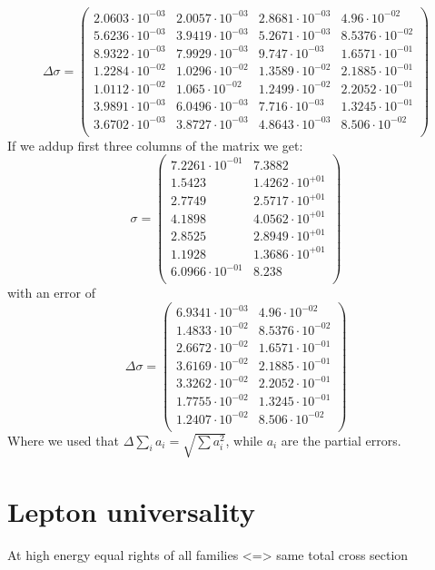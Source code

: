 \documentclass[]{article}
\begin{document}
\begin{equation}
\Delta\sigma=\begin{pmatrix}
   2.0603\cdot 10^{-03} & 2.0057\cdot 10^{-03} & 2.8681\cdot 10^{-03} & 4.96\cdot 10^{-02} \\
   5.6236\cdot 10^{-03} & 3.9419\cdot 10^{-03} & 5.2671\cdot 10^{-03} & 8.5376\cdot 10^{-02} \\
   8.9322\cdot 10^{-03} & 7.9929\cdot 10^{-03} & 9.747\cdot 10^{-03} & 1.6571\cdot 10^{-01} \\
   1.2284\cdot 10^{-02} & 1.0296\cdot 10^{-02} & 1.3589\cdot 10^{-02} & 2.1885\cdot 10^{-01} \\
   1.0112\cdot 10^{-02} & 1.065\cdot 10^{-02} & 1.2499\cdot 10^{-02} & 2.2052\cdot 10^{-01} \\
   3.9891\cdot 10^{-03} & 6.0496\cdot 10^{-03} & 7.716\cdot 10^{-03} & 1.3245\cdot 10^{-01} \\
   3.6702\cdot 10^{-03} & 3.8727\cdot 10^{-03} & 4.8643\cdot 10^{-03} & 8.506\cdot 10^{-02} \\
\end{pmatrix}
\end{equation}
If we addup first three columns of the matrix we get:
\begin{equation}
\sigma=
\begin{pmatrix}
   7.2261\cdot 10^{-01} & 7.3882 \\
   1.5423 & 1.4262\cdot 10^{+01} \\
   2.7749 & 2.5717\cdot 10^{+01} \\
   4.1898 & 4.0562\cdot 10^{+01} \\
   2.8525 & 2.8949\cdot 10^{+01} \\
   1.1928 & 1.3686\cdot 10^{+01} \\
   6.0966\cdot 10^{-01} & 8.238 \\
\end{pmatrix}
\end{equation}
with an error of
\begin{equation}
\Delta\sigma=
\begin{pmatrix}
   6.9341\cdot 10^{-03} & 4.96\cdot 10^{-02} \\
   1.4833\cdot 10^{-02} & 8.5376\cdot 10^{-02} \\
   2.6672\cdot 10^{-02} & 1.6571\cdot 10^{-01} \\
   3.6169\cdot 10^{-02} & 2.1885\cdot 10^{-01} \\
   3.3262\cdot 10^{-02} & 2.2052\cdot 10^{-01} \\
   1.7755\cdot 10^{-02} & 1.3245\cdot 10^{-01} \\
   1.2407\cdot 10^{-02} & 8.506\cdot 10^{-02} \\
\end{pmatrix}
\end{equation}
Where we used that $\Delta\sum_i a_i=\sqrt{\sum a_i^2}$, while $a_i$ are the partial errors.


\section{Lepton universality}
At high energy equal rights of all families <=> same total cross section

\pagebreak
\nocite{*}
\printbibliography
\end{document}
